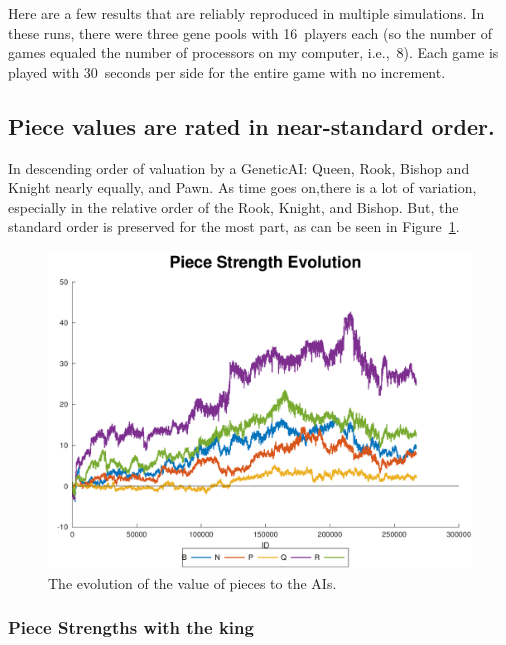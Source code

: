 \documentclass[letterpaper]{article}
\renewcommand{\_}{\allowbreak\textunderscore\allowbreak}
\begin{document}
Here are a few results that are reliably reproduced in multiple simulations. In these runs, there were three gene pools with 16~players each (so the number of games equaled the number of processors on my computer, i.e.,~8). Each game is played with 30~seconds per side for the entire game with no increment.

\subsection{Piece values are rated in near-standard order.}
In descending order of valuation by a Genetic\_AI\@: Queen, Rook, Bishop and Knight nearly equally, and Pawn. As time goes on,there is a lot of variation, especially in the relative order of the Rook, Knight, and Bishop. But, the standard order is preserved for the most part, as can be seen in Figure~\ref{piece-value-plot}.
\begin{figure}[htb]
	\centering
	\includegraphics[width=\textwidth]{pawn-crash-strength-plot}
	\caption{The evolution of the value of pieces to the AIs.}\label{piece-value-plot}
\end{figure}

\subsubsection{Piece Strengths with the king}\label{piece-strength-with-king}
\end{document}
